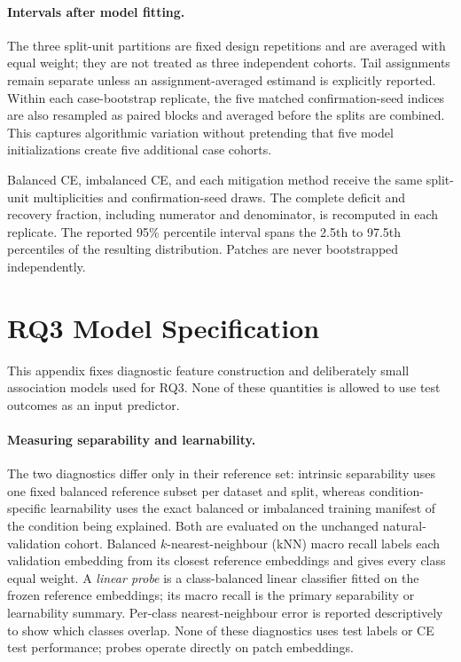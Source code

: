 \documentclass[11pt]{article}
\begin{document}
\paragraph{Intervals after model fitting.}
The three split-unit partitions are fixed design repetitions and are averaged with equal weight; they are not treated as three independent cohorts. Tail assignments remain separate unless an assignment-averaged estimand is explicitly reported. Within each case-bootstrap replicate, the five matched confirmation-seed indices are also resampled as paired blocks and averaged before the splits are combined. This captures algorithmic variation without pretending that five model initializations create five additional case cohorts.

Balanced CE, imbalanced CE, and each mitigation method receive the same split-unit multiplicities and confirmation-seed draws. The complete deficit and recovery fraction, including numerator and denominator, is recomputed in each replicate. The reported 95\% percentile interval spans the 2.5th to 97.5th percentiles of the resulting distribution. Patches are never bootstrapped independently.

\section{RQ3 Model Specification}
\label{app:rq3}
This appendix fixes diagnostic feature construction and deliberately small association models used for RQ3. None of these quantities is allowed to use test outcomes as an input predictor.

\paragraph{Measuring separability and learnability.}
The two diagnostics differ only in their reference set: intrinsic separability uses one fixed balanced reference subset per dataset and split, whereas condition-specific learnability uses the exact balanced or imbalanced training manifest of the condition being explained. Both are evaluated on the unchanged natural-validation cohort. Balanced $k$-nearest-neighbour (kNN) macro recall labels each validation embedding from its closest reference embeddings and gives every class equal weight. A \emph{linear probe} is a class-balanced linear classifier fitted on the frozen reference embeddings; its macro recall is the primary separability or learnability summary. Per-class nearest-neighbour error is reported descriptively to show which classes overlap. None of these diagnostics uses test labels or CE test performance; probes operate directly on patch embeddings.
\end{document}
